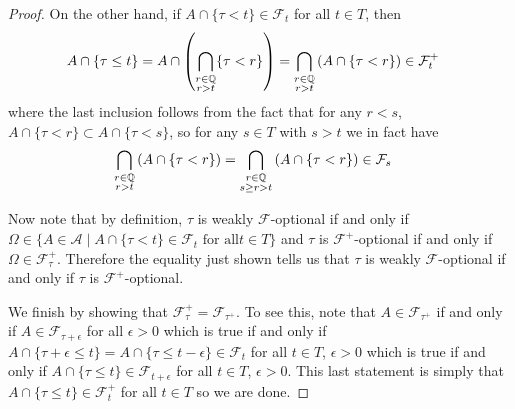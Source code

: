 \begin{proof}
On the other hand, if $A \cap \lbrace \tau < t \rbrace \in
\mathcal{F}_t$ for all $t \in T$, then
\begin{align*}
A \cap \lbrace \tau \leq t \rbrace &= A \cap \left ( \bigcap_{\substack{r \in \mathbb{Q} \\ r >
  t}} \lbrace \tau < r \rbrace \right ) =  \bigcap_{\substack{r \in \mathbb{Q} \\ r >
  t}} \left ( A \cap  \lbrace \tau < r \rbrace \right ) \in \mathcal{F}^+_t
\end{align*}
where the last inclusion follows from the fact that for any $r < s$, $ A \cap
\lbrace \tau < r \rbrace \subset  A \cap  \lbrace \tau < s
\rbrace$, so for any $s \in T$ with $s > t$ we in fact
have
\begin{align*}
\bigcap_{\substack{r \in \mathbb{Q} \\ r >
  t}} \left ( A \cap  \lbrace \tau < r \rbrace \right ) &= 
\bigcap_{\substack{r \in  \mathbb{Q} \\ 
s \geq r >  t}} \left ( A \cap  \lbrace \tau < r \rbrace \right ) \in \mathcal{F}_s
\end{align*}

Now note that by definition, $\tau$ is weakly $\mathcal{F}$-optional if and only if
$\Omega \in \lbrace A \in \mathcal{A}
\mid A \cap \lbrace \tau < t \rbrace \in \mathcal{F}_t \text { for all
} t \in T \rbrace$ and $\tau$ is $\mathcal{F}^+$-optional
if and only if $\Omega \in \mathcal{F}^+_\tau$.  Therefore the equality just shown tells us that
$\tau$ is weakly $\mathcal{F}$-optional if and only if $\tau$ is 
$\mathcal{F}^+$-optional.

We finish by showing that $\mathcal{F}^+_\tau =
\mathcal{F}_{\tau^+}$.  To see this, note that $A \in
\mathcal{F}_{\tau^+}$ if and only if $A \in
\mathcal{F}_{\tau + \epsilon}$ for all $\epsilon > 0$ which is true if and only
if $A \cap \lbrace \tau + \epsilon \leq t 
\rbrace =  A \cap \lbrace \tau \leq t - \epsilon
\rbrace\in \mathcal{F}_{t}$ for all $t \in T$, $\epsilon > 0$ which is
true if and only if $A \cap \lbrace \tau \leq t 
\rbrace\in \mathcal{F}_{t+\epsilon}$ for all $t \in T$, $\epsilon >
0$.  This last statement is simply that $A \cap \lbrace \tau \leq t 
\rbrace\in \mathcal{F}^+_t$ for all $t \in T$ so we are done.
\end{proof}


